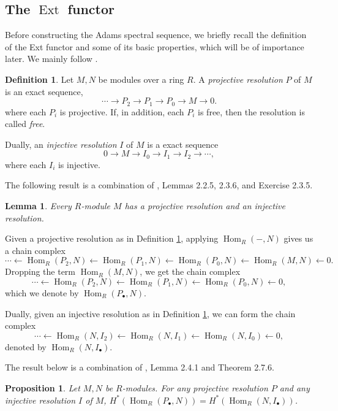 \documentclass[11pt, titlepage]{article} %
\DeclareMathOperator{\Ext}{Ext}
\DeclareMathOperator{\Hom}{Hom}
\numberwithin{equation}{subsection}
\theoremstyle{plain}
\newtheorem{lemma}[theorem]{Lemma}
\newtheorem{proposition}[theorem]{Proposition}
\theoremstyle{definition}
\newtheorem{definition}[theorem]{Definition}
\begin{document}
\subsection{The \(\Ext\) functor}\label{2504291247}
Before constructing the Adams spectral sequence, we briefly recall the definition of the Ext functor and some of its basic properties, which will be of importance later. We mainly follow \autocite{weibel}.

\begin{definition}\label{2504211942}
Let \(M, N\) be modules over a ring \(R\). A \textit{projective resolution} \(P\) of \(M\) is an exact sequence,
\[\cdots \to P_2 \to P_1 \to P_0 \to M \to 0.\]
where each \(P_i\) is projective. If, in addition, each \(P_i\) is free, then the resolution is called \textit{free}. 

Dually, an \textit{injective resolution} \(I\) of \(M\) is a exact sequence
\[0 \to M \to I_0 \to I_1 \to I_2 \to \cdots,\]
where each \(I_i\) is injective.
\end{definition}

The following result is a combination of \autocite{weibel}, Lemmas 2.2.5, 2.3.6, and Exercise 2.3.5. 

\begin{lemma}
Every \(R\)-module \(M\) has a projective resolution and an injective resolution. 
\end{lemma}

Given a projective resolution as in Definition  \ref{2504211942}, applying \(\Hom_R(-, N)\) gives us a chain complex
\[\cdots \leftarrow \Hom_R(P_2, N) \leftarrow \Hom_R(P_1, N) \leftarrow \Hom_R(P_0, N) \leftarrow \Hom_R(M, N) \leftarrow 0.\]
Dropping the term \(\Hom_R(M, N)\), we get the chain complex
\[\cdots \leftarrow \Hom_R(P_2, N) \leftarrow \Hom_R(P_1, N) \leftarrow \Hom_R(P_0, N) \leftarrow 0,\]
which we denote by \(\Hom_R(P_\bullet, N)\). 

Dually, given an injective resolution as in Definition \ref{2504211942}, we can form the chain complex
\[\cdots \leftarrow \Hom_R(N, I_2) \leftarrow \Hom_R(N, I_1) \leftarrow \Hom_R(N, I_0)\leftarrow 0,\]
denoted by \(\Hom_R(N, I_\bullet)\).

The result below is a combination of \autocite{weibel}, Lemma 2.4.1 and Theorem 2.7.6. 

\begin{proposition}
Let \(M, N\) be \(R\)-modules. For any projective resolution \(P\) and any injective resolution \(I\) of \(M\), \(H^*(\Hom_R(P_\bullet, N))=H^*(\Hom_R(N,I_\bullet))\).
\end{proposition}
\end{document}
